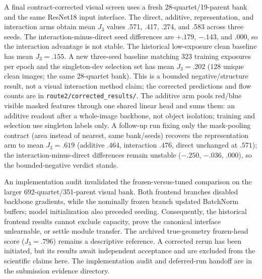 A final contract-corrected visual screen uses a fresh 28-quartet/19-parent bank and the same ResNet18 input interface. The direct, additive, representation, and interaction arms obtain mean $J_3$ values .571, .417, .274, and .583 across three seeds. The interaction-minus-direct seed differences are $+.179$, $-.143$, and $.000$, so the interaction advantage is not stable. The historical low-exposure clean baseline has mean $J_3=.155$. A new three-seed baseline matching 323 training exposures per epoch and the singleton-dev selection set has mean $J_3=.202$ (128 unique clean images; the same 28-quartet bank). This is a bounded negative/structure result, not a visual interaction method claim; the corrected predictions and flow counts are in \texttt{route2/corrected\_results/}. The additive arm pools red/blue visible masked features through one shared linear head and sums them: an additive readout after a whole-image backbone, not object isolation; training and selection use singleton labels only. A follow-up run fixing only the mask-pooling contract (area instead of nearest, same bank/seeds) recovers the representation arm to mean $J_3=.619$ (additive $.464$, interaction $.476$, direct unchanged at $.571$); the interaction-minus-direct differences remain unstable ($-.250$, $-.036$, $.000$), so the bounded-negative verdict stands.

An implementation audit invalidated the frozen-versus-tuned comparison on the larger 692-quartet/351-parent visual bank. Both frontend branches disabled backbone gradients, while the nominally frozen branch updated BatchNorm buffers; model initialization also preceded seeding. Consequently, the historical frontend results cannot exclude capacity, prove the canonical interface unlearnable, or settle module transfer. The archived true-geometry frozen-head score ($J_3=.796$) remains a descriptive reference. A corrected rerun has been initiated, but its results await independent acceptance and are excluded from the scientific claims here. The implementation audit and deferred-run handoff are in the submission evidence directory.
